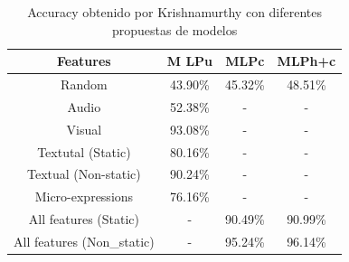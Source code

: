 \begin{onehalfspacing}
\begin{table}[h!]
\centering
    \begin{tabular}{|c|c|c|c|}
        \hline 
        Features & M LPu & MLPc & MLPh+c\tabularnewline
        \hline 
        \hline 
        Random & 43.90\% & 45.32\% & 48.51\%\tabularnewline
        \hline 
        Audio & 52.38\% & - & -\tabularnewline
        \hline 
        Visual & 93.08\% & - & -\tabularnewline
        \hline 
        Textutal (Static) & 80.16\% & - & -\tabularnewline
        \hline 
        Textual (Non-static) & 90.24\% & - & -\tabularnewline
        \hline 
        Micro-expressions & 76.16\% & - & -\tabularnewline
        \hline 
        All features (Static) & - & 90.49\% & 90.99\%\tabularnewline
        \hline 
        All features (Non\_static) & - & 95.24\% & 96.14\%\tabularnewline
        \hline 
    \end{tabular}
	\caption{\footnotesize Accuracy obtenido por Krishnamurthy con diferentes propuestas de modelos}
	\label{tab:Figura_Navonil_accuracy}
\end{table}


\end{onehalfspacing}

